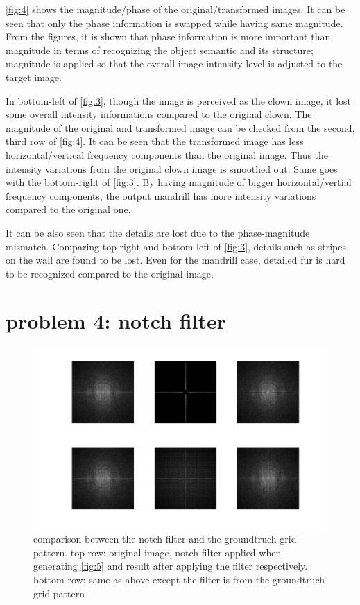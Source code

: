 \documentclass[extendedabs]{bmvc2k}
\begin{document}
\figurename{\ref{fig:4}} shows the magnitude/phase of the original/transformed images. It can
be seen that only the phase information is swapped while having same magnitude.
From the figures, it is shown that phase information is more important than magnitude in terms
of recognizing the object semantic and its structure; magnitude is applied so that the overall
image intensity level is adjusted to the target image. 

In bottom-left of \figurename{\ref{fig:3}}, though the image is perceived as the clown image, 
it lost some overall intensity informations compared to the original clown. 
The magnitude of the original and transformed image can be checked from the second, third row of 
\figurename{\ref{fig:4}}. It can be seen that the transformed image has less horizontal/vertical
frequency components than the original image. Thus the intensity variations from the original clown
image is smoothed out. Same goes with the bottom-right of \figurename{\ref{fig:3}}. By having
magnitude of bigger horizontal/vertial frequency components, the output mandrill has more intensity
variations compared to the original one.

It can be also seen that the details are lost due to the phase-magnitude mismatch. 
Comparing top-right and bottom-left of \figurename{\ref{fig:3}}, details such as stripes on the wall
are found to be lost. Even for the mandrill case, detailed fur is hard to be recognized compared to the original image.

\section*{problem 4: notch filter}

\begin{figure}[h]
    \centering
    \includegraphics[width=0.7\linewidth]{hw3_4_3}
    \caption{comparison between the notch filter and the groundtruch grid pattern. top row: original image,
    notch filter applied when generating \figurename{\ref{fig:5}} and result after applying the filter 
    respectively. bottom row: same as above except the filter is from the groundtruch grid pattern}
    \label{fig:7}
\end{figure}
\end{document}
